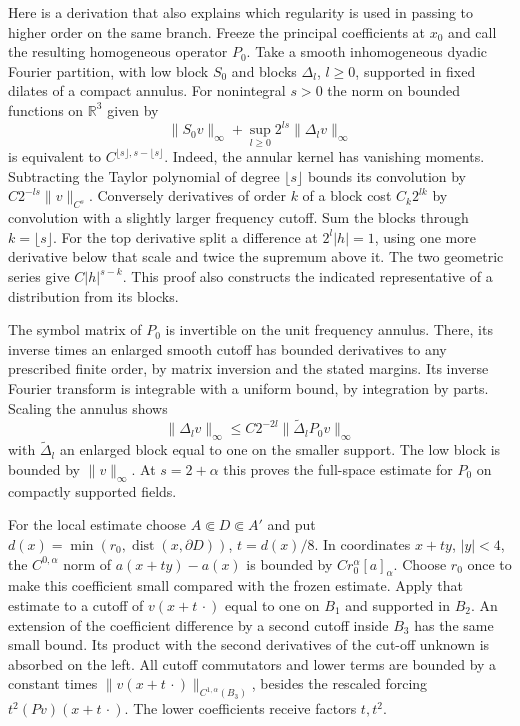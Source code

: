 \documentclass[
  english,
  11pt,
  reqno]{amsart}
\begin{document}
Here is a derivation that also explains which regularity is used in
passing to higher order on the same branch. Freeze the principal
coefficients at \(x_0\) and call the resulting homogeneous operator
\(P_0\). Take a smooth inhomogeneous dyadic Fourier partition, with low
block \(S_0\) and blocks \(\Delta_l\), \(l\ge0\), supported in fixed
dilates of a compact annulus. For nonintegral \(s>0\) the norm on
bounded functions on \(\mathbb R^3\) given by \[
\|S_0v\|_\infty+\sup_{l\ge0}2^{ls}\|\Delta_lv\|_\infty
\] is equivalent to \(C^{\lfloor s\rfloor,s-\lfloor s\rfloor}\). Indeed,
the annular kernel has vanishing moments. Subtracting the Taylor
polynomial of degree \(\lfloor s\rfloor\) bounds its convolution by
\(C2^{-ls}\|v\|_{C^s}\). Conversely derivatives of order \(k\) of a
block cost \(C_k2^{lk}\) by convolution with a slightly larger frequency
cutoff. Sum the blocks through \(k=\lfloor s\rfloor\). For the top
derivative split a difference at \(2^l|h|=1\), using one more derivative
below that scale and twice the supremum above it. The two geometric
series give \(C|h|^{s-k}\). This proof also constructs the indicated
representative of a distribution from its blocks.

The symbol matrix of \(P_0\) is invertible on the unit frequency
annulus. There, its inverse times an enlarged smooth cutoff has bounded
derivatives to any prescribed finite order, by matrix inversion and the
stated margins. Its inverse Fourier transform is integrable with a
uniform bound, by integration by parts. Scaling the annulus shows \[
\|\Delta_lv\|_\infty\le C2^{-2l}\|\widetilde\Delta_l P_0v\|_\infty
\] with \(\widetilde\Delta_l\) an enlarged block equal to one on the
smaller support. The low block is bounded by \(\|v\|_\infty\). At
\(s=2+\alpha\) this proves the full-space estimate for \(P_0\) on
compactly supported fields.

For the local estimate choose \(A\Subset D\Subset A'\) and put
\(d(x)=\allowbreak\min(r_0,\allowbreak\operatorname{dist}(x,\partial D))\), \(t=d(x)/8\). In
coordinates \(x+ty\), \(|y|<4\), the \(C^{0,\alpha}\) norm of
\(a(x+ty)-a(x)\) is bounded by \(C r_0^\alpha[a]_\alpha\). Choose
\(r_0\) once to make this coefficient small compared with the frozen
estimate. Apply that estimate to a cutoff of \(v(x+t\,\cdot)\) equal to
one on \(B_1\) and supported in \(B_2\). An extension of the coefficient
difference by a second cutoff inside \(B_3\) has the same small bound.
Its product with the second derivatives of the cut-off unknown is
absorbed on the left. All cutoff commutators and lower terms are bounded
by a constant times \(\|v(x+t\,\cdot)\|_{C^{1,\alpha}(B_3)}\), besides
the rescaled forcing \(t^2(Pv)(x+t\,\cdot)\). The lower coefficients
receive factors \(t,t^2\).
\end{document}
